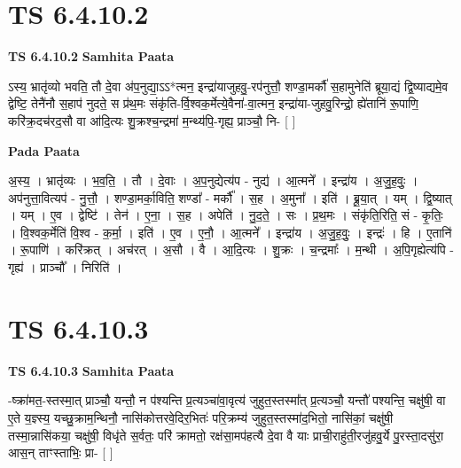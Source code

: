 \documentclass[17pt]{extarticle}
\begin{document}

\section{ TS 6.4.10.2 }

\textbf{TS 6.4.10.2 } \newline
\textbf{Samhita Paata} \newline

ऽस्य॒ भ्रातृ॑व्यो भवति॒ तौ दे॒वा अ॑प॒नुद्या॒ऽऽ*त्मन॒ इन्द्रा॑याजुहवु॒-रप॑नुत्तौ॒ शण्डा॒मर्कौ॑ स॒हामुनेति॑ ब्रूया॒द्यं द्वि॒ष्याद्यमे॒व द्वेष्टि॒ तेनै॑नौ स॒हाप॑ नुदते॒ स प्र॑थ॒मः संकृ॑ति-र्वि॒श्वक॒र्मेत्ये॒वैना॑-वा॒त्मन॒ इन्द्रा॑या-जुहवु॒रिन्द्रो॒ ह्ये॑तानि॑ रू॒पाणि॒ करि॑क्र॒दच॑रद॒सौ वा आ॑दि॒त्यः शु॒क्रश्च॒न्द्रमा॑ म॒न्थ्य॑पि॒-गृह्य॒ प्राञ्चौ॒ नि- [  ] \newline

\textbf{Pada Paata} \newline

अ॒स्य॒ । भ्रातृ॑व्यः । भ॒व॒ति॒ । तौ । दे॒वाः । अ॒प॒नुद्येत्य॑प - नुद्य॑ । आ॒त्मने᳚ । इन्द्रा॑य । अ॒जु॒ह॒वुः॒ । अप॑नुत्ता॒वित्यप॑ - नु॒त्तौ॒ । शण्डा॒मर्का॒विति॒ शण्डा᳚ - मर्कौ᳚ । स॒ह । अ॒मुना᳚ । इति॑ । ब्रू॒या॒त् । यम् । द्वि॒ष्यात् । यम् । ए॒व । द्वेष्टि॑ । तेन॑ । ए॒ना॒ । स॒ह । अपेति॑ । नु॒द॒ते॒ । सः । प्र॒थ॒मः । संकृ॑ति॒रिति॒ सं - कृ॒तिः॒ । वि॒श्वक॒र्मेति॑ वि॒श्व - क॒र्मा॒ । इति॑ । ए॒व । ए॒नौ॒ । आ॒त्मने᳚ । इन्द्रा॑य । अ॒जु॒ह॒वुः॒ । इन्द्रः॑ । हि । ए॒तानि॑ । रू॒पाणि॑ । करि॑क्रत् । अच॑रत् । अ॒सौ । वै । आ॒दि॒त्यः । शु॒क्रः । च॒न्द्रमाः᳚ । म॒न्थी । अ॒पि॒गृह्येत्य॑पि - गृह्य॑ । प्राञ्चौ᳚ । निरिति॑ ।  \newline





\section{ TS 6.4.10.3 }

\textbf{TS 6.4.10.3 } \newline
\textbf{Samhita Paata} \newline

-ष्क्रा॑मत॒-स्तस्मा॒त् प्राञ्चौ॒ यन्तौ॒ न प॑श्यन्ति प्र॒त्यञ्चा॑वा॒वृत्य॑ जुहुत॒स्तस्मा᳚त् प्र॒त्यञ्चौ॒ यन्तौ॑ पश्यन्ति॒ चक्षु॑षी॒ वा ए॒ते य॒ज्ञ्स्य॒ यच्छु॒क्राम॒न्थिनौ॒ नासि॑कोत्तरवे॒दिर॒भितः॑ परि॒क्रम्य॑ जुहुत॒स्तस्मा॑द॒भितो॒ नासि॑कां॒ चक्षु॑षी॒ तस्मा॒न्नासि॑कया॒ चक्षु॑षी॒ विधृ॑ते स॒र्वतः॒ परि॑ क्रामतो॒ रक्ष॑सा॒मप॑हत्यै दे॒वा वै याः प्राची॒राहु॑ती॒रजु॑हवु॒र्ये पु॒रस्ता॒दसु॑रा॒ आस॒न् ताꣳस्ताभिः॒ प्रा- [  ] \newline
\end{document}
